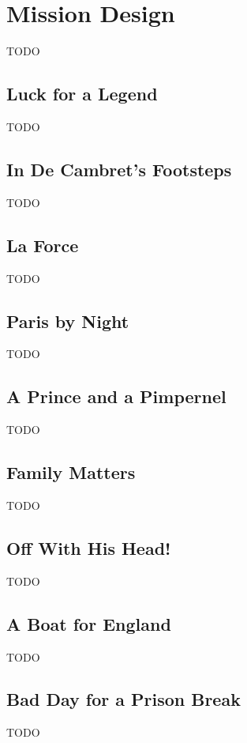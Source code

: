 \chapter{Mission Design}

TODO

\section{Luck for a Legend}

TODO

\section{In De Cambret's Footsteps}

TODO

\section{La Force}

TODO

\section{Paris by Night}

TODO

\section{A Prince and a Pimpernel}

TODO

\section{Family Matters}

TODO

\section{Off With His Head!}

TODO

\section{A Boat for England}

TODO

\section{Bad Day for a Prison Break}

TODO
